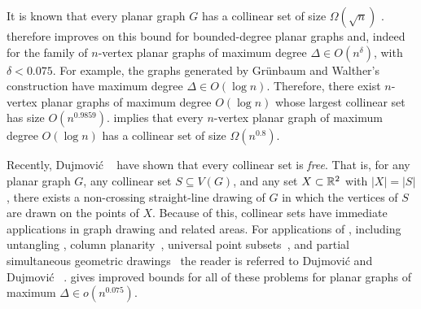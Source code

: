 \documentclass{patmorin}
\begin{document}
It is known that every planar graph $G$ has a collinear set of size
$\Omega(\sqrt{n})$ \cite{bose.dujmovic.ea:polynomial,dujmovic:utility}
.  therefore improves on this bound for bounded-degree planar
graphs and, indeed for the family of $n$-vertex planar graphs of maximum
degree $\Delta\in O(n^{\delta})$, with $\delta < 0.075$.  For example,
the graphs generated by Gr\"unbaum and Walther's construction have maximum
degree $\Delta \in O(\log n)$.  Therefore, there exist $n$-vertex planar
graphs of maximum degree $O(\log n)$ whose largest collinear set has size
$O(n^{0.9859})$.   implies that every
$n$-vertex planar graph of maximum degree $O(\log n)$ has a collinear
set of size $\Omega(n^{0.8})$.

Recently, Dujmovi\'c \etal\ \cite{dujmovic.frati.ea:every} have shown
that every collinear set is \emph{free}. That is, for any planar graph
$G$, any collinear set $S\subseteq V(G)$, and any set $X\subset\mathbb{R}^2$
with $|X|=|S|$, there exists a non-crossing straight-line drawing of $G$
in which the vertices of $S$ are drawn on the points of $X$.  Because of
this, collinear sets have immediate applications in graph drawing and
related areas.  For applications of , including untangling
\cite{cibulka:untangling,pach.tardos:untangling,watanabe:open,goaoc.kratochvil.ea:untangling,kang.pikhurko.ea:untangling,bose.dujmovic.ea:polynomial,dalozzo.dujmovic.ea:drawing,dujmovic:utility,ravsky.verbitsky:on},
column
planarity~\cite{barba.evans.ea:column,evans.kusters.ea:column,dalozzo.dujmovic.ea:drawing,dujmovic:utility},
universal point
subsets~\cite{digiacomo.liotta.ea:how,angelini.binucci.ea:universal,dalozzo.dujmovic.ea:drawing,dujmovic:utility},
and partial simultaneous geometric
drawings~\cite{evans.kusters.ea:column,barba.hoffmann.ea:column,angelini.evans.ea:sefe,blasius.kobourov.ea:simultaneous,dujmovic:utility}
the reader is referred to Dujmovi\'c \cite{dujmovic:utility}
and Dujmovi\'c \etal\ \cite[Section~1.1]{dujmovic.frati.ea:every}.
 gives improved bounds for all of these problems for planar
graphs of maximum $\Delta\in o(n^{0.075})$.
\end{document}
